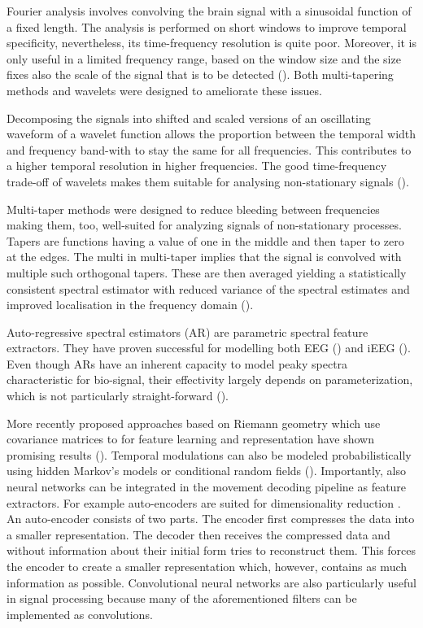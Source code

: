 Fourier analysis involves convolving the brain signal with a sinusoidal function of a fixed length. The analysis is performed on short windows to improve temporal specificity, nevertheless, its time-frequency resolution is quite poor.
Moreover, it is only useful in a limited frequency range, based on the window size and the size fixes also the scale of the signal that is to be detected (\cite{36-vugt-2007}). 
Both multi-tapering methods and wavelets were designed to ameliorate these issues. 

Decomposing the signals into shifted and scaled versions of an oscillating waveform of a wavelet function allows the proportion between the temporal width and frequency band-with to stay the same for all frequencies. 
This contributes to a higher temporal resolution in higher frequencies. The good time-frequency trade-off of wavelets makes them suitable for analysing non-stationary signals (\cite{36-vugt-2007}).  

Multi-taper methods were designed to reduce bleeding between frequencies making them, too, well-suited for analyzing signals of non-stationary processes. 
Tapers are functions having a value of one in the middle and then taper to zero at the edges. 
The multi in multi-taper implies that the signal is convolved with multiple such orthogonal tapers.
These are then averaged yielding a statistically consistent spectral estimator with reduced variance of the spectral estimates and improved localisation in the frequency domain (\cite{multitaper-31}). 

Auto-regressive spectral estimators (AR) are parametric spectral feature extractors. They have proven successful for modelling both EEG (\cite{auto-regressive-eeg}) and iEEG (\cite{anderson-offline-2009}). 
Even though ARs have an inherent capacity to model peaky spectra characteristic for bio-signal, their effectivity largely depends on parameterization, which is not particularly straight-forward (\cite{anderson-offline-2009}). 

More recently proposed approaches based on Riemann geometry which use covariance matrices to for feature learning and representation have shown promising results (\cite{coherence-based}). 
Temporal modulations can also be modeled probabilistically using hidden Markov's models or conditional random fields (\cite{markov-models-decoding, bayesian-decoding}). 
Importantly, also neural networks can be integrated in the movement decoding pipeline as feature extractors. For example auto-encoders are suited for dimensionality reduction \cite{autoencoder}.
An auto-encoder consists of two parts.
The encoder first compresses the data into a smaller representation.
The decoder then receives the compressed data and without information about their initial form tries to reconstruct them. This forces the encoder to create a smaller representation which, however, contains as much information as possible. 
Convolutional neural networks are also particularly useful in signal processing because many of the aforementioned filters can be implemented as convolutions. 



